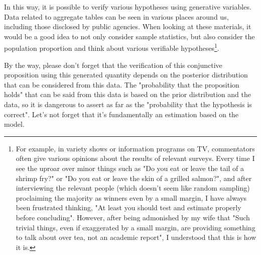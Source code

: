 \documentclass{ltjsbook}
\begin{document}
In this way, it is possible to verify various hypotheses using generative variables. Data related to aggregate tables can be seen in various places around us, including those disclosed by public agencies. When looking at these materials, it would be a good idea to not only consider sample statistics, but also consider the population proportion and think about various verifiable hypotheses\footnote{For example, in variety shows or information programs on TV, commentators often give various opinions about the results of relevant surveys. Every time I see the uproar over minor things such as "Do you eat or leave the tail of a shrimp fry?" or "Do you eat or leave the skin of a grilled salmon?", and after interviewing the relevant people (which doesn't seem like random sampling) proclaiming the majority as winners even by a small margin, I have always been frustrated thinking, "At least you should test and estimate properly before concluding". However, after being admonished by my wife that "Such trivial things, even if exaggerated by a small margin, are providing something to talk about over tea, not an academic report", I understood that this is how it is.}.

By the way, please don't forget that the verification of this conjunctive proposition using this generated quantity depends on the posterior distribution that can be considered from this data. The "probability that the proposition holds" that can be said from this data is based on the prior distribution and the data, so it is dangerous to assert as far as the "probability that the hypothesis is correct". Let's not forget that it's fundamentally an estimation based on the model.
\end{document}
